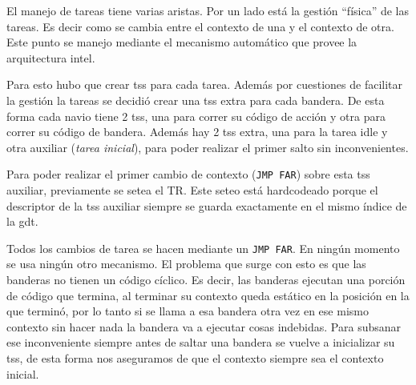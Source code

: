 	El manejo de tareas tiene varias aristas. Por un lado está
la gestión ``física'' de las tareas. Es decir como se cambia entre el contexto
de una y el contexto de otra. Este punto se manejo mediante el mecanismo
automático que provee la arquitectura intel.

	Para esto hubo que crear tss para cada tarea. Además por cuestiones
de facilitar la gestión la tareas se decidió crear una tss extra para cada
bandera. De esta forma cada navio tiene 2 tss, una para correr su código
de acción y otra para correr su código de bandera. Además hay 2 tss
extra, una para la tarea idle y otra auxiliar (\emph{tarea inicial}), para poder realizar
el primer salto sin inconvenientes.

	Para poder realizar el primer cambio de contexto (\texttt{JMP FAR}) sobre esta
tss auxiliar, previamente se setea el TR. Este seteo está hardcodeado
porque el descriptor de la tss auxiliar siempre se guarda exactamente
en el mismo índice de la gdt.

	Todos los cambios de tarea se hacen mediante un \texttt{JMP FAR}. En ningún
momento se usa ningún otro mecanismo. El problema que surge con
esto es que las banderas no tienen un código cíclico. Es decir, las banderas
ejecutan una porción de código que termina, al terminar su contexto queda
estático en la posición en la que terminó, por lo tanto si se llama a esa bandera
otra vez en ese mismo contexto sin hacer nada la bandera va a ejecutar 
cosas indebidas. Para subsanar ese inconveniente siempre antes de saltar una
bandera se vuelve a inicializar su tss, de esta forma nos aseguramos de que el contexto
siempre sea el contexto inicial.

	
